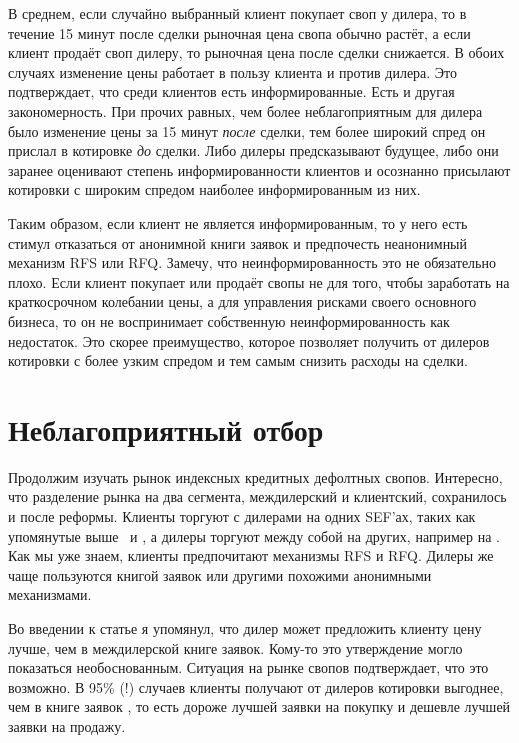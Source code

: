 В среднем, если случайно выбранный клиент покупает своп у дилера, то в течение
15 минут после сделки рыночная цена свопа обычно растёт, а если клиент продаёт
своп дилеру, то рыночная цена после сделки снижается. В обоих случаях изменение
цены работает в пользу клиента и против дилера. Это подтверждает, что среди
клиентов есть информированные. Есть и другая закономерность. При прочих равных,
чем более неблагоприятным для дилера было изменение цены за 15 минут
\emph{после} сделки, тем более широкий спред он прислал в котировке \emph{до}
сделки. Либо дилеры предсказывают будущее, либо они заранее оценивают степень
информированности клиентов и осознанно присылают котировки с широким спредом
наиболее информированным из них.

Таким образом, если клиент не является информированным, то у него есть стимул
отказаться от анонимной книги заявок и предпочесть неанонимный механизм RFS или
RFQ. Замечу, что неинформированность это не обязательно плохо. Если клиент
покупает или продаёт свопы не для того, чтобы заработать на краткосрочном
колебании цены, а для управления рисками своего основного бизнеса, то он не
воспринимает собственную неинформированность как недостаток. Это скорее
преимущество, которое позволяет получить от дилеров котировки с более узким
спредом и тем самым снизить расходы на сделки.

\section*{Неблагоприятный отбор}

Продолжим изучать рынок индексных кредитных дефолтных свопов. Интересно, что
разделение рынка на два сегмента, междилерский и клиентский, сохранилось и после
реформы. Клиенты торгуют с дилерами на одних SEF'ах, таких как упомянутые выше
\ и , а дилеры торгуют между собой на других,
например на . Как мы уже знаем,
клиенты предпочитают механизмы RFS и RFQ. Дилеры же чаще пользуются книгой
заявок или другими похожими анонимными механизмами.

Во введении к статье я упомянул, что дилер может предложить клиенту цену лучше,
чем в междилерской книге заявок. Кому-то это утверждение могло показаться
необоснованным. Ситуация на рынке свопов подтверждает, что это возможно. В 95\%
(!) случаев клиенты получают от дилеров котировки выгоднее, чем в книге заявок
, то есть дороже лучшей заявки на покупку и дешевле
лучшей заявки на продажу.

